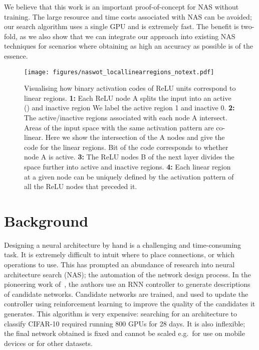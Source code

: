 \documentclass{article}
\begin{document}
We believe that this work is an important proof-of-concept for NAS without training. The large resource and time costs associated with NAS can be avoided; our search algorithm uses a single GPU and is extremely fast. The benefit is two-fold, as we also show that we can integrate our approach into existing NAS techniques for scenarios where obtaining as high an accuracy as possible is of the essence. 




\begin{figure*}[!h]
\centering

    \texttt{[image: figures/naswot\_locallinearregions\_notext.pdf]}
\caption{Visualising how binary activation codes of ReLU units correspond to linear regions.
{\bf 1:} Each ReLU node A splits the input into an active () and inactive region We label the active region 1 and inactive 0. {\bf 2:} The active/inactive regions associated with each node A intersect. Areas of the input space with the same activation pattern are co-linear. Here we show the intersection of the A nodes and give the code for the linear regions. Bit  of the code corresponds to whether node A is active. {\bf 3:} The ReLU nodes B of the next layer divides the space further into active and inactive regions. {\bf 4:} Each linear region at a given node can be uniquely defined by the activation pattern of all the ReLU nodes that preceded it.}
    \label{fig:locallinearcodes} 
\end{figure*}


\section{Background}
\label{sec:lit}

Designing a neural architecture by hand is a challenging and time-consuming task. It is extremely difficult to intuit where to place connections, or which operations to use. This has prompted an abundance of research into neural architecture search (NAS); the automation of the network design process. In the pioneering work of~\cite{zoph2017neural}, the authors use an RNN controller to generate descriptions of candidate networks. Candidate networks are trained, and used to update the controller using reinforcement learning to improve the quality of the candidates it generates. This algorithm is very expensive: searching for an architecture to classify CIFAR-10 required running 800 GPUs for 28 days. It is also inflexible; the final network obtained is fixed and cannot be scaled e.g.\ for use on mobile devices or for other datasets.
\end{document}
